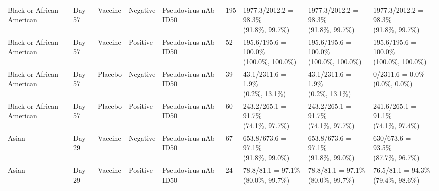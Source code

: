 \documentclass[]{book}
\theoremstyle{definition}
\theoremstyle{definition}
\theoremstyle{definition}
\newcommand{\1}{\mathbbm{1}}
\begin{document}
\begin{landscape}
\begin{ThreePartTable}
\begin{longtable}[t]{>{\raggedright\arraybackslash}p{2.7cm}llllllll}
\hspace{1em}Black or African American & Day 57 & Vaccine & Negative & Pseudovirus-nAb ID50 & 195 & \makecell[l]{1977.3/2012.2 = 98.3\%\\(91.8\%, 99.7\%)} & \makecell[l]{1977.3/2012.2 = 98.3\%\\(91.8\%, 99.7\%)} & \makecell[l]{1977.3/2012.2 = 98.3\%\\(91.8\%, 99.7\%)}\\
\hspace{1em}Black or African American & Day 57 & Vaccine & Positive & Pseudovirus-nAb ID50 & 52 & \makecell[l]{195.6/195.6 = 100.0\%\\(100.0\%, 100.0\%)} & \makecell[l]{195.6/195.6 = 100.0\%\\(100.0\%, 100.0\%)} & \makecell[l]{195.6/195.6 = 100.0\%\\(100.0\%, 100.0\%)}\\
\hspace{1em}Black or African American & Day 57 & Placebo & Negative & Pseudovirus-nAb ID50 & 39 & \makecell[l]{43.1/2311.6 = 1.9\%\\(0.2\%, 13.1\%)} & \makecell[l]{43.1/2311.6 = 1.9\%\\(0.2\%, 13.1\%)} & \makecell[l]{0/2311.6 = 0.0\%\\(0.0\%, 0.0\%)}\\
\hspace{1em}Black or African American & Day 57 & Placebo & Positive & Pseudovirus-nAb ID50 & 60 & \makecell[l]{243.2/265.1 = 91.7\%\\(74.1\%, 97.7\%)} & \makecell[l]{243.2/265.1 = 91.7\%\\(74.1\%, 97.7\%)} & \makecell[l]{241.6/265.1 = 91.1\%\\(74.1\%, 97.4\%)}\\
\hspace{1em}Asian & Day 29 & Vaccine & Negative & Pseudovirus-nAb ID50 & 67 & \makecell[l]{653.8/673.6 = 97.1\%\\(91.8\%, 99.0\%)} & \makecell[l]{653.8/673.6 = 97.1\%\\(91.8\%, 99.0\%)} & \makecell[l]{630/673.6 = 93.5\%\\(87.7\%, 96.7\%)}\\
\hspace{1em}Asian & Day 29 & Vaccine & Positive & Pseudovirus-nAb ID50 & 24 & \makecell[l]{78.8/81.1 = 97.1\%\\(80.0\%, 99.7\%)} & \makecell[l]{78.8/81.1 = 97.1\%\\(80.0\%, 99.7\%)} & \makecell[l]{76.5/81.1 = 94.3\%\\(79.4\%, 98.6\%)}\\

\end{longtable}
\end{ThreePartTable}
\end{landscape}
\end{document}
